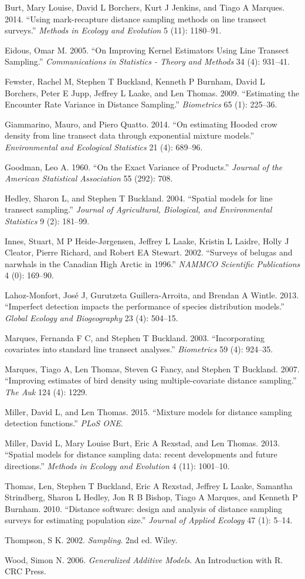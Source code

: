 \documentclass[article]{jss}
\begin{document}
Burt, Mary Louise, David L Borchers, Kurt J Jenkins, and Tiago A
Marques. 2014. ``Using mark-recapture distance sampling methods on line
transect surveys.'' \emph{Methods in Ecology and Evolution} 5 (11):
1180--91.

Eidous, Omar M. 2005. ``On Improving Kernel Estimators Using Line
Transect Sampling.'' \emph{Communications in Statistics - Theory and
Methods} 34 (4): 931--41.

Fewster, Rachel M, Stephen T Buckland, Kenneth P Burnham, David L
Borchers, Peter E Jupp, Jeffrey L Laake, and Len Thomas. 2009.
``Estimating the Encounter Rate Variance in Distance Sampling.''
\emph{Biometrics} 65 (1): 225--36.

Giammarino, Mauro, and Piero Quatto. 2014. ``On estimating Hooded crow
density from line transect data through exponential mixture models.''
\emph{Environmental and Ecological Statistics} 21 (4): 689--96.

Goodman, Leo A. 1960. ``On the Exact Variance of Products.''
\emph{Journal of the American Statistical Association} 55 (292): 708.

Hedley, Sharon L, and Stephen T Buckland. 2004. ``Spatial models for
line transect sampling.'' \emph{Journal of Agricultural, Biological, and
Environmental Statistics} 9 (2): 181--99.

Innes, Stuart, M P Heide-J{ø}rgensen, Jeffrey L Laake, Kristin L Laidre,
Holly J Cleator, Pierre Richard, and Robert EA Stewart. 2002. ``Surveys
of belugas and narwhals in the Canadian High Arctic in 1996.''
\emph{NAMMCO Scientific Publications} 4 (0): 169--90.

Lahoz-Monfort, Jos{é} J, Gurutzeta Guillera-Arroita, and Brendan A
Wintle. 2013. ``Imperfect detection impacts the performance of species
distribution models.'' \emph{Global Ecology and Biogeography} 23 (4):
504--15.

Marques, Fernanda F C, and Stephen T Buckland. 2003. ``Incorporating
covariates into standard line transect analyses.'' \emph{Biometrics} 59
(4): 924--35.

Marques, Tiago A, Len Thomas, Steven G Fancy, and Stephen T Buckland.
2007. ``Improving estimates of bird density using multiple-covariate
distance sampling.'' \emph{The Auk} 124 (4): 1229.

Miller, David L, and Len Thomas. 2015. ``Mixture models for distance
sampling detection functions.'' \emph{PLoS ONE}.

Miller, David L, Mary Louise Burt, Eric A Rexstad, and Len Thomas. 2013.
``Spatial models for distance sampling data: recent developments and
future directions.'' \emph{Methods in Ecology and Evolution} 4 (11):
1001--10.

Thomas, Len, Stephen T Buckland, Eric A Rexstad, Jeffrey L Laake,
Samantha Strindberg, Sharon L Hedley, Jon R B Bishop, Tiago A Marques,
and Kenneth P Burnham. 2010. ``Distance software: design and analysis of
distance sampling surveys for estimating population size.''
\emph{Journal of Applied Ecology} 47 (1): 5--14.

Thompson, S K. 2002. \emph{Sampling}. 2nd ed. Wiley.

Wood, Simon N. 2006. \emph{Generalized Additive Models}. An Introduction
with R. CRC Press.
\end{document}
